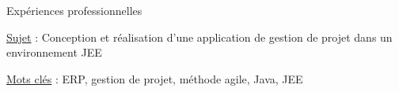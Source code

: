 \begin{rubric}{Expériences professionnelles}
     \hfill{} 
    \par \underline{Sujet} : {Conception et réalisation d'une application de gestion de projet dans un environnement JEE}
    \hfill {}
    \par \underline{Mots clés} : ERP, gestion de projet, méthode agile, Java, JEE
      \hfill {}
%
%
%
\end{rubric}
